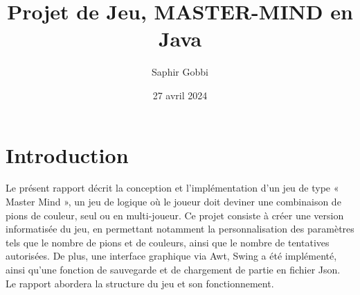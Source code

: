 \documentclass{article}
\title{Projet de Jeu, MASTER-MIND en Java}
\author{Saphir Gobbi}
\date{27 avril 2024}
\begin{document}
\maketitle
 
\tableofcontents
            


\section{Introduction}
Le présent rapport décrit la conception et l'implémentation d'un jeu de type « Master Mind », un jeu de logique où le joueur doit deviner une combinaison de pions de couleur, seul ou en multi-joueur. Ce projet consiste à créer une version informatisée du jeu, en permettant notamment la personnalisation des paramètres tels que le nombre de pions et de couleurs, ainsi que le nombre de tentatives autorisées. De plus, une interface graphique via Awt, Swing a été implémenté, ainsi qu'une fonction de sauvegarde et de chargement de partie en fichier Json. \\
Le rapport abordera la structure du jeu et son fonctionnement.
\end{document}
